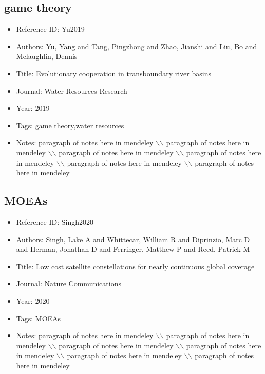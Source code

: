 \documentclass[11pt]{article}
\begin{document}
\subsection{game theory} 
\noindent\citep{Yu2019} 
\begin{itemize} 
\item{Reference ID:  Yu2019} 

\item{Authors:  Yu, Yang and Tang, Pingzhong and Zhao, Jianshi and Liu, Bo and Mclaughlin, Dennis} 

\item{Title:  Evolutionary cooperation in transboundary river basins} 

\item{Journal:  Water Resources Research} 

\item{Year:  2019} 

\item{Tags:  game theory,water resources} 

\item{Notes:  paragraph of notes here in mendeley $\backslash$$\backslash$ paragraph of notes here in mendeley $\backslash$$\backslash$ paragraph of notes here in mendeley $\backslash$$\backslash$ paragraph of notes here in mendeley $\backslash$$\backslash$ paragraph of notes here in mendeley $\backslash$$\backslash$ paragraph of notes here in mendeley} 

\end{itemize}\medskip



\subsection{MOEAs} 
\noindent\citep{Singh2020} 
\begin{itemize} 
\item{Reference ID:  Singh2020} 

\item{Authors:  Singh, Lake A and Whittecar, William R and Diprinzio, Marc D and Herman, Jonathan D and Ferringer, Matthew P and Reed, Patrick M} 

\item{Title:  Low cost satellite constellations for nearly continuous global coverage} 

\item{Journal:  Nature Communications} 

\item{Year:  2020} 

\item{Tags:  MOEAs} 

\item{Notes:  paragraph of notes here in mendeley $\backslash$$\backslash$ paragraph of notes here in mendeley $\backslash$$\backslash$ paragraph of notes here in mendeley $\backslash$$\backslash$ paragraph of notes here in mendeley $\backslash$$\backslash$ paragraph of notes here in mendeley $\backslash$$\backslash$ paragraph of notes here in mendeley} 

\end{itemize}\medskip
\end{document}
